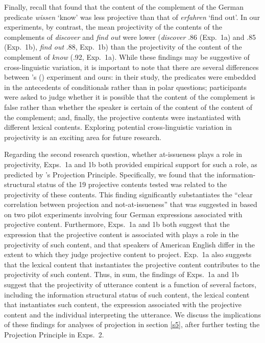 \documentclass[11pt,fleqn]{article}
\newcommand{\6}{\mbox{$[\hspace*{-.6mm}[$}}
\newcommand{\9}{\mbox{$]\hspace*{-.6mm}]$}}
\newcommand{\citepos}[1]{\citeauthor{#1}'s \citeyear{#1}}
\newcommand{\citetpos}[1]{\citeauthor{#1}'s (\citeyear{#1})}
\begin{document}
Finally, recall that \citet{xue-onea11} found that the content of the complement of the German predicate {\em wissen} `know' was less projective than that of {\em erfahren} `find out'. In our experiments, by contrast, the mean projectivity of the contents of the complements of {\em discover} and {\em find out} were lower ({\em discover} .86 (Exp.~1a) and .85 (Exp.~1b), {\em find out} .88, Exp.~1b) than the projectivity of the content of the complement of {\em know} (.92, Exp.~1a). While these findings may be suggestive of cross-linguistic variation, it is important to note that there are several differences between \citetpos{xue-onea11} experiment and ours: in their study, the predicates were embedded in the antecedents of conditionals rather than in polar questions; participants were asked to judge whether it is possible that the content of the complement is false rather than whether the speaker is certain of the content of the content of the complement; and, finally, the projective contents were instantiated with different lexical contents. Exploring potential cross-linguistic variation in projectivity is an exciting area for future research.

Regarding the second research question, whether at-issueness plays a role in projectivity, Exps.~1a and 1b both provided empirical support for such a role, as predicted by  \citepos{brst-ar} Projection Principle. Specifically, we found that the information-structural status of the 19 projective contents tested was related to the projectivity of these contents. This finding significantly substantiates the ``clear correlation between projection and not-at-issueness'' that was suggested in \citealt[180]{xue-onea11} based on two pilot experiments involving four German expressions associated with projective content. Furthermore, Exps.~1a and 1b both suggest that the expression that the projective content is associated with plays a role in the projectivity of such content, and that speakers of American English differ in the extent to which they judge projective content to project. Exp.~1a also suggests that the lexical content that instantiates the projective content contributes to the projectivity of such content. Thus, in sum, the findings of Exps.~1a and 1b suggest that the projectivity of utterance content is a function of several factors, including the information structural status of such content, the lexical content that instantiates such content, the expression associated with the projective content and the individual interpreting the utterance. We discuss the implications of these findings for analyses of projection in section \ref{s5}, after further testing the Projection Principle in Exps.~2.
\end{document}
